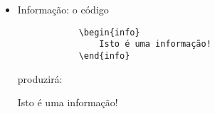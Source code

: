 \begin{itemize}
    \item Informação: o código
        \begin{verbatim}
            \begin{info}
                Isto é uma informação!
            \end{info}\end{verbatim}
        produzirá:
        \begin{info}
            Isto é uma informação!
        \end{info}
\end{itemize}    

